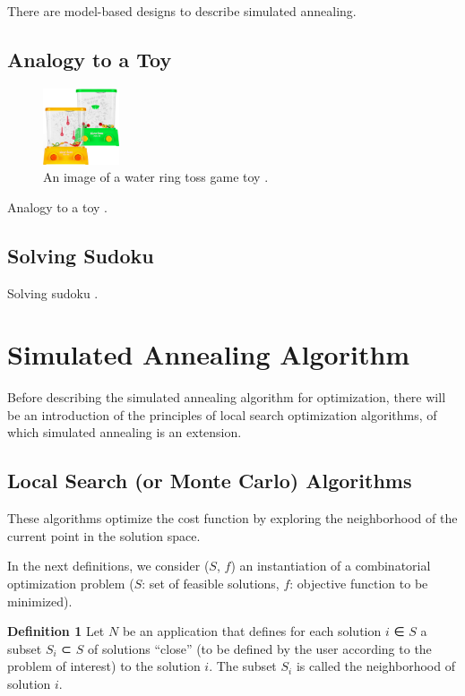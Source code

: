 \documentclass[conference]{IEEEtran}
\begin{document}
There are model-based designs to describe simulated annealing.

\subsection{Analogy to a Toy}

\begin{figure}[H]
\centerline{\includegraphics[width=0.2\textwidth,height=0.2\textheight,keepaspectratio]{fig2.jpg}}
\caption{An image of a water ring toss game toy \cite{b3}.}
\end{figure}

Analogy to a toy \cite{b4}. 

\subsection{Solving Sudoku}

Solving sudoku \cite{b5}.

\section{Simulated Annealing Algorithm}

Before describing the simulated annealing algorithm for optimization, there will be an introduction of the principles of local search optimization algorithms, of which simulated annealing is an extension.

\subsection{Local Search (or Monte Carlo) Algorithms}

These algorithms optimize the cost function by exploring the neighborhood of the current point in the solution space.

In the next definitions, we consider ($S$, $f$) an instantiation of a combinatorial optimization problem ($S$: set of feasible solutions, $f$: objective function to be minimized).

\textbf{Definition 1} Let $N$ be an application that defines for each solution $i$ ∈ $S$ a subset $S_{i}$ ⊂ $S$ of solutions “close” (to be defined by the user according to the problem of interest) to the solution $i$. The subset $S_{i}$ is called the neighborhood of solution $i$.
\end{document}
